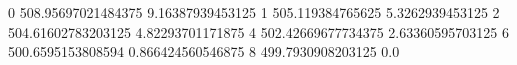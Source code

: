 0 508.95697021484375 9.16387939453125
1 505.119384765625 5.3262939453125
2 504.61602783203125 4.82293701171875
4 502.42669677734375 2.63360595703125
6 500.6595153808594 0.866424560546875
8 499.7930908203125 0.0
